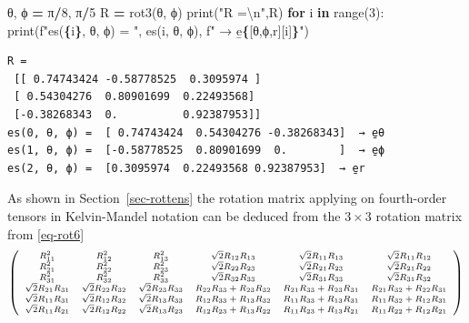 \documentclass[
  a4paper,
  numbers=noendperiod,
  DIV=12]{scrreprt}
\newenvironment{Shaded}{\begin{snugshade}}{\end{snugshade}}
\newcommand{\BuiltInTok}[1]{#1}
\newcommand{\CharTok}[1]{\textcolor[rgb]{0.31,0.60,0.02}{#1}}
\newcommand{\ControlFlowTok}[1]{\textcolor[rgb]{0.13,0.29,0.53}{\textbf{#1}}}
\newcommand{\DecValTok}[1]{\textcolor[rgb]{0.00,0.00,0.81}{#1}}
\newcommand{\KeywordTok}[1]{\textcolor[rgb]{0.13,0.29,0.53}{\textbf{#1}}}
\newcommand{\NormalTok}[1]{#1}
\newcommand{\OperatorTok}[1]{\textcolor[rgb]{0.81,0.36,0.00}{\textbf{#1}}}
\newcommand{\SpecialCharTok}[1]{\textcolor[rgb]{0.81,0.36,0.00}{\textbf{#1}}}
\newcommand{\SpecialStringTok}[1]{\textcolor[rgb]{0.31,0.60,0.02}{#1}}
\newcommand{\StringTok}[1]{\textcolor[rgb]{0.31,0.60,0.02}{#1}}
\begin{document}
\begin{Shaded}
\begin{Highlighting}[]
\NormalTok{θ, ϕ }\OperatorTok{=}\NormalTok{ π}\OperatorTok{/}\DecValTok{8}\NormalTok{, π}\OperatorTok{/}\DecValTok{5}
\NormalTok{R }\OperatorTok{=}\NormalTok{ rot3(θ, ϕ)}
\BuiltInTok{print}\NormalTok{(}\StringTok{"R =}\CharTok{\textbackslash{}n}\StringTok{"}\NormalTok{,R)}
\ControlFlowTok{for}\NormalTok{ i }\KeywordTok{in} \BuiltInTok{range}\NormalTok{(}\DecValTok{3}\NormalTok{): }\BuiltInTok{print}\NormalTok{(}\SpecialStringTok{f"es(}\SpecialCharTok{\{}\NormalTok{i}\SpecialCharTok{\}}\SpecialStringTok{, θ, ϕ) = "}\NormalTok{, es(i, θ, ϕ), }\SpecialStringTok{f" → e̱}\SpecialCharTok{\{}\NormalTok{[}\StringTok{\textquotesingle{}θ\textquotesingle{}}\NormalTok{,}\StringTok{\textquotesingle{}ϕ\textquotesingle{}}\NormalTok{,}\StringTok{\textquotesingle{}r\textquotesingle{}}\NormalTok{][i]}\SpecialCharTok{\}}\SpecialStringTok{"}\NormalTok{)}
\end{Highlighting}
\end{Shaded}

\begin{verbatim}
R =
 [[ 0.74743424 -0.58778525  0.3095974 ]
 [ 0.54304276  0.80901699  0.22493568]
 [-0.38268343  0.          0.92387953]]
es(0, θ, ϕ) =  [ 0.74743424  0.54304276 -0.38268343]  → e̱θ
es(1, θ, ϕ) =  [-0.58778525  0.80901699  0.        ]  → e̱ϕ
es(2, θ, ϕ) =  [0.3095974  0.22493568 0.92387953]  → e̱r
\end{verbatim}

As shown in Section~\ref{sec-rottens} the rotation matrix applying on
fourth-order tensors in Kelvin-Mandel notation can be deduced from the
\(3×3\) rotation matrix from \ref{eq-rot6} \[
\scriptsize
   \left(
\begin{array}{cccccc}
R_{1 1}^{2} & R_{1 2}^{2} & R_{1 3}^{2} & \sqrt{2}  R_{1 2}  R_{1 3} & \sqrt{2}  R_{1 1}  R_{1 3} & \sqrt{2}  R_{1 1}  R_{1 2} \\
R_{2 1}^{2} & R_{2 2}^{2} & R_{2 3}^{2} & \sqrt{2}  R_{2 2}  R_{2 3} & \sqrt{2}  R_{2 1}  R_{2 3} & \sqrt{2}  R_{2 1}  R_{2 2} \\
R_{3 1}^{2} & R_{3 2}^{2} & R_{3 3}^{2} & \sqrt{2}  R_{3 2}  R_{3 3} & \sqrt{2}  R_{3 1}  R_{3 3} & \sqrt{2}  R_{3 1}  R_{3 2} \\
\sqrt{2}  R_{2 1}  R_{3 1} & \sqrt{2}  R_{2 2}  R_{3 2} & \sqrt{2}  R_{2 3}  R_{3 3} & R_{2 2}  R_{3 3} + R_{2 3}  R_{3 2} & R_{2 1}  R_{3 3} + R_{2 3}  R_{3 1} & R_{2 1}  R_{3 2} + R_{2 2}  R_{3 1} \\
\sqrt{2}  R_{1 1}  R_{3 1} & \sqrt{2}  R_{1 2}  R_{3 2} & \sqrt{2}  R_{1 3}  R_{3 3} & R_{1 2}  R_{3 3} + R_{1 3}  R_{3 2} & R_{1 1}  R_{3 3} + R_{1 3}  R_{3 1} & R_{1 1}  R_{3 2} + R_{1 2}  R_{3 1} \\
\sqrt{2}  R_{1 1}  R_{2 1} & \sqrt{2}  R_{1 2}  R_{2 2} & \sqrt{2}  R_{1 3}  R_{2 3} & R_{1 2}  R_{2 3} + R_{1 3}  R_{2 2} & R_{1 1}  R_{2 3} + R_{1 3}  R_{2 1} & R_{1 1}  R_{2 2} + R_{1 2}  R_{2 1} \\
\end{array}
\right)
\]
\end{document}
